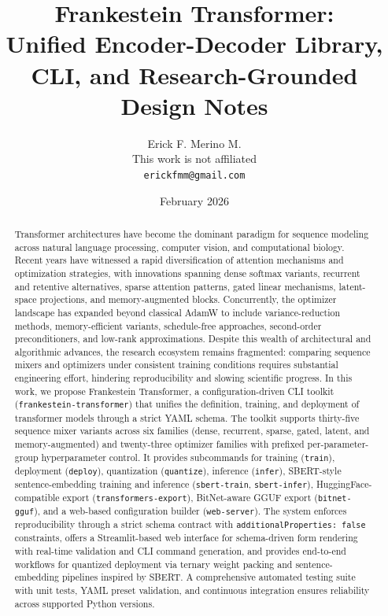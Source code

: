 \documentclass[11pt,a4paper]{article}
\title{Frankestein Transformer:\\Unified Encoder-Decoder Library, CLI, and Research-Grounded Design Notes}
\author{
Erick F. Merino M. \\
This work is not affiliated \\
\texttt{erickfmm@gmail.com}
}
\date{February 2026}
\begin{document}
\maketitle

\begin{abstract}
Transformer architectures have become the dominant paradigm for sequence modeling across natural language processing, computer vision, and computational biology. Recent years have witnessed a rapid diversification of attention mechanisms and optimization strategies, with innovations spanning dense softmax variants, recurrent and retentive alternatives, sparse attention patterns, gated linear mechanisms, latent-space projections, and memory-augmented blocks. Concurrently, the optimizer landscape has expanded beyond classical AdamW to include variance-reduction methods, memory-efficient variants, schedule-free approaches, second-order preconditioners, and low-rank approximations. Despite this wealth of architectural and algorithmic advances, the research ecosystem remains fragmented: comparing sequence mixers and optimizers under consistent training conditions requires substantial engineering effort, hindering reproducibility and slowing scientific progress. In this work, we propose Frankestein Transformer, a configuration-driven CLI toolkit (\texttt{frankestein-transformer}) that unifies the definition, training, and deployment of transformer models through a strict YAML schema. The toolkit supports thirty-five sequence mixer variants across six families (dense, recurrent, sparse, gated, latent, and memory-augmented) and twenty-three optimizer families with prefixed per-parameter-group hyperparameter control. It provides subcommands for training (\texttt{train}), deployment (\texttt{deploy}), quantization (\texttt{quantize}), inference (\texttt{infer}), SBERT-style sentence-embedding training and inference (\texttt{sbert-train}, \texttt{sbert-infer}), HuggingFace-compatible export (\texttt{transformers-export}), BitNet-aware GGUF export (\texttt{bitnet-gguf}), and a web-based configuration builder (\texttt{web-server}). The system enforces reproducibility through a strict schema contract with \texttt{additionalProperties: false} constraints, offers a Streamlit-based web interface for schema-driven form rendering with real-time validation and CLI command generation, and provides end-to-end workflows for quantized deployment via ternary weight packing and sentence-embedding pipelines inspired by SBERT. A comprehensive automated testing suite with unit tests, YAML preset validation, and continuous integration ensures reliability across supported Python versions.
\end{abstract}
\end{document}
